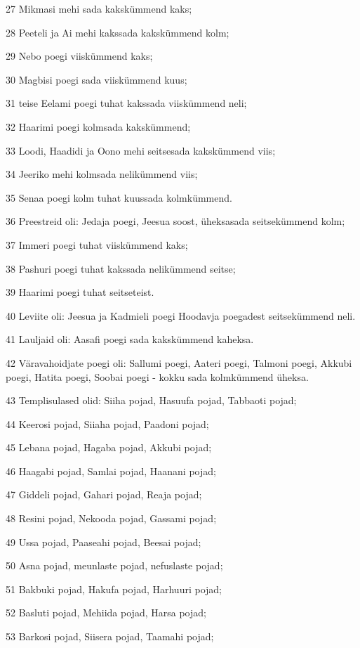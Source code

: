 \par 27 Mikmasi mehi sada kakskümmend kaks;
\par 28 Peeteli ja Ai mehi kakssada kakskümmend kolm;
\par 29 Nebo poegi viiskümmend kaks;
\par 30 Magbisi poegi sada viiskümmend kuus;
\par 31 teise Eelami poegi tuhat kakssada viiskümmend neli;
\par 32 Haarimi poegi kolmsada kakskümmend;
\par 33 Loodi, Haadidi ja Oono mehi seitsesada kakskümmend viis;
\par 34 Jeeriko mehi kolmsada nelikümmend viis;
\par 35 Senaa poegi kolm tuhat kuussada kolmkümmend.
\par 36 Preestreid oli: Jedaja poegi, Jeesua soost, üheksasada seitsekümmend kolm;
\par 37 Immeri poegi tuhat viiskümmend kaks;
\par 38 Pashuri poegi tuhat kakssada nelikümmend seitse;
\par 39 Haarimi poegi tuhat seitseteist.
\par 40 Leviite oli: Jeesua ja Kadmieli poegi Hoodavja poegadest seitsekümmend neli.
\par 41 Lauljaid oli: Aasafi poegi sada kakskümmend kaheksa.
\par 42 Väravahoidjate poegi oli: Sallumi poegi, Aateri poegi, Talmoni poegi, Akkubi poegi, Hatita poegi, Soobai poegi - kokku sada kolmkümmend üheksa.
\par 43 Templisulased olid: Siiha pojad, Hasuufa pojad, Tabbaoti pojad;
\par 44 Keerosi pojad, Siiaha pojad, Paadoni pojad;
\par 45 Lebana pojad, Hagaba pojad, Akkubi pojad;
\par 46 Haagabi pojad, Samlai pojad, Haanani pojad;
\par 47 Giddeli pojad, Gahari pojad, Reaja pojad;
\par 48 Resini pojad, Nekooda pojad, Gassami pojad;
\par 49 Ussa pojad, Paaseahi pojad, Beesai pojad;
\par 50 Asna pojad, meunlaste pojad, nefuslaste pojad;
\par 51 Bakbuki pojad, Hakufa pojad, Harhuuri pojad;
\par 52 Basluti pojad, Mehiida pojad, Harsa pojad;
\par 53 Barkosi pojad, Siisera pojad, Taamahi pojad;
